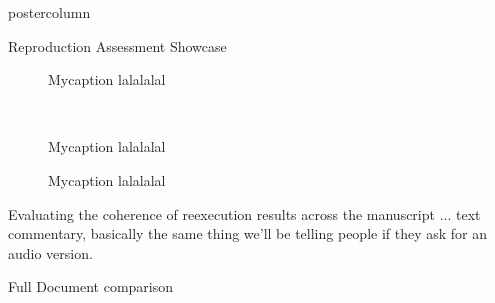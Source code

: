 \begin{frame}
\begin{columns}
\begin{column}{.59\textwidth}
\begin{beamercolorbox}[center]{postercolumn}
\begin{minipage}{.98\textwidth}
{\begin{myblock}{Reproduction Assessment Showcase}
\begin{minipage}{.58\textwidth}
\begin{figure}
							\vspace{0.2em}
							\caption{
								Mycaption lalalalal
							}
						\end{figure}
						\end{minipage}~
						\begin{minipage}{.38\textwidth}
						\begin{figure}
							\vspace{0.2em}
							\caption{
								Mycaption lalalalal
							}
						\end{figure}
						\begin{figure}
							\vspace{0.2em}
							\caption{
								Mycaption lalalalal
							}
						\end{figure}
						Evaluating the coherence of reexecution results across the manuscript ... text commentary, basically the same thing we'll be telling people if they ask for an audio version.
						\end{minipage}
					\end{myblock}\vfill
					\begin{myblock}{Full Document comparison}
						\vspace{0.75em}
						\\
						\vspace{.3em}
					\end{myblock}\vfill
		}\end{minipage}\end{beamercolorbox}
	\end{column}
\end{columns}
\end{frame}


